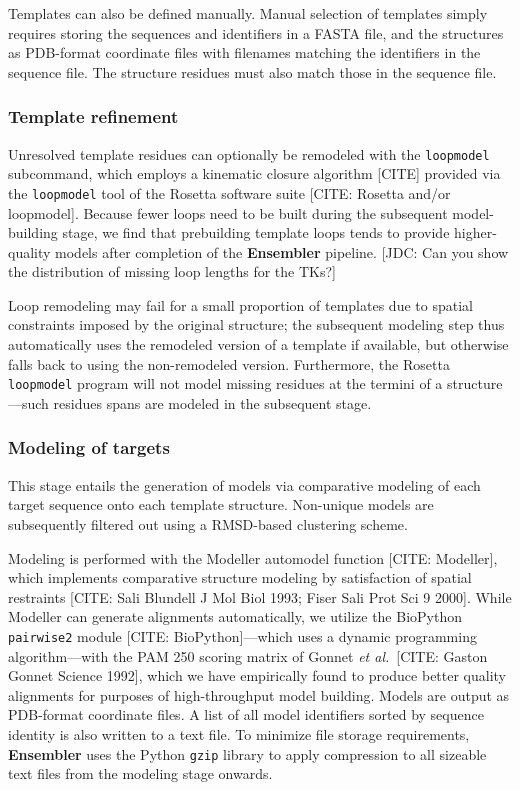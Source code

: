 \documentclass[aps,pre,twocolumn,nofootinbib,superscriptaddress,linenumbers]{revtex4-1}
\begin{document}
Templates can also be defined manually.
Manual selection of templates simply requires storing the sequences and identifiers in a FASTA file, and the structures as PDB-format coordinate files with filenames matching the identifiers in the sequence file.
The structure residues must also match those in the sequence file.

\subsubsection*{Template refinement}

Unresolved template residues can optionally be remodeled with the {\tt loopmodel} subcommand, which employs a kinematic closure algorithm {\color{red}[CITE]} provided via the {\tt loopmodel} tool of the Rosetta software suite {\color{red}[CITE: Rosetta and/or loopmodel]}.
Because fewer loops need to be built during the subsequent model-building stage, we find that prebuilding template loops tends to provide higher-quality models after completion of the {\bf Ensembler} pipeline.
{\color{red}[JDC: Can you show the distribution of missing loop lengths for the TKs?]}

Loop remodeling may fail for a small proportion of templates due to spatial constraints imposed by the original structure; the subsequent modeling step thus automatically uses the remodeled version of a template if available, but otherwise falls back to using the non-remodeled version.
Furthermore, the Rosetta {\tt loopmodel} program will not model missing residues at the termini of a structure---such residues spans are modeled in the subsequent stage.

\subsubsection*{Modeling of targets}

This stage entails the generation of models via comparative modeling of each target sequence onto each template structure. Non-unique models are subsequently filtered out using a RMSD-based clustering scheme.

Modeling is performed with the Modeller automodel function {\color{red}[CITE: Modeller]}, which implements comparative structure modeling by satisfaction of spatial restraints {\color{red}[CITE: Sali Blundell J Mol Biol 1993; Fiser Sali Prot Sci 9 2000]}.
While Modeller can generate alignments automatically, we utilize the BioPython {\tt pairwise2} module [CITE: BioPython]---which uses a dynamic programming algorithm---with the PAM 250 scoring matrix of Gonnet \textit{et al.}~{\color{red}[CITE: Gaston Gonnet Science 1992]}, which we have empirically found to produce better quality alignments for purposes of high-throughput model building.
Models are output as PDB-format coordinate files.
A list of all model identifiers sorted by sequence identity is also written to a text file.
To minimize file storage requirements, {\bf Ensembler} uses the Python {\tt gzip} library to apply compression to all sizeable text files from the modeling stage onwards.
\end{document}
